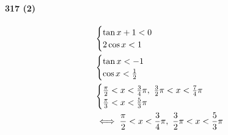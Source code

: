 \documentclass[fleqn,a4j,dvipdfmx,uplatex,twocolumn]{jsarticle}
\def\nr{\notag\\}%
\begin{document}
\paragraph{317 (2)}
\begin{align*}
  &\begin{cases} \tan x + 1 < 0 \nr 2 \cos x < 1 \end{cases} \nr
  &\begin{cases} \tan x < -1 \nr \cos x < \frac{1}{2} \end{cases} \nr
  &\begin{cases} \frac{\pi}{2} < x < \frac{3}{4} \pi, \ \frac{3}{2} \pi < x < \frac{7}{4} \pi \nr \frac{\pi}{3} < x < \frac{5}{3} \pi \end{cases} \nr
  &\iff \frac{\pi}{2} < x < \frac{3}{4} \pi, \ \frac{3}{2} \pi < x < \frac{5}{3} \pi
\end{align*}
\end{document}
